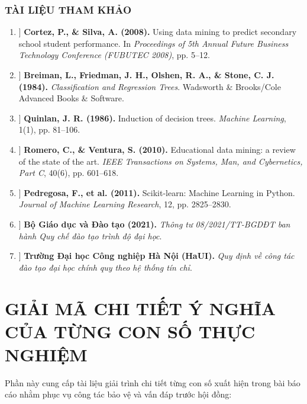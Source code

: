 \documentclass[12pt,a4paper]{article}
\begin{document}
\section*{TÀI LIỆU THAM KHẢO}

\begin{enumerate}
    \item[\bf [1]] \textbf{Cortez, P., \& Silva, A. (2008).} Using data mining to predict secondary school student performance. In \textit{Proceedings of 5th Annual Future Business Technology Conference (FUBUTEC 2008)}, pp. 5--12.
    \item[\bf [2]] \textbf{Breiman, L., Friedman, J. H., Olshen, R. A., \& Stone, C. J. (1984).} \textit{Classification and Regression Trees}. Wadsworth \& Brooks/Cole Advanced Books \& Software.
    \item[\bf [3]] \textbf{Quinlan, J. R. (1986).} Induction of decision trees. \textit{Machine Learning}, 1(1), pp. 81--106.
    \item[\bf [4]] \textbf{Romero, C., \& Ventura, S. (2010).} Educational data mining: a review of the state of the art. \textit{IEEE Transactions on Systems, Man, and Cybernetics, Part C}, 40(6), pp. 601--618.
    \item[\bf [5]] \textbf{Pedregosa, F., et al. (2011).} Scikit-learn: Machine Learning in Python. \textit{Journal of Machine Learning Research}, 12, pp. 2825--2830.
    \item[\bf [6]] \textbf{Bộ Giáo dục và Đào tạo (2021).} \textit{Thông tư 08/2021/TT-BGDĐT ban hành Quy chế đào tạo trình độ đại học}.
    \item[\bf [7]] \textbf{Trường Đại học Công nghiệp Hà Nội (HaUI).} \textit{Quy định về công tác đào tạo đại học chính quy theo hệ thống tín chỉ}.
\end{enumerate}

\newpage
\part{GIẢI MÃ CHI TIẾT Ý NGHĨA CỦA TỪNG CON SỐ THỰC NGHIỆM}

Phần này cung cấp tài liệu giải trình chi tiết từng con số xuất hiện trong bài báo cáo nhằm phục vụ công tác bảo vệ và vấn đáp trước hội đồng:
\end{document}
